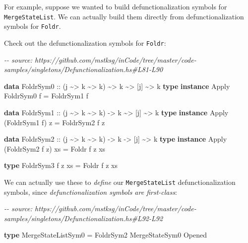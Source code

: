 \documentclass[]{article}
\newenvironment{Shaded}{}{}
\newcommand{\CommentTok}[1]{\textcolor[rgb]{0.38,0.63,0.69}{\textit{#1}}}
\newcommand{\DataTypeTok}[1]{\textcolor[rgb]{0.56,0.13,0.00}{#1}}
\newcommand{\KeywordTok}[1]{\textcolor[rgb]{0.00,0.44,0.13}{\textbf{#1}}}
\newcommand{\NormalTok}[1]{#1}
\newcommand{\OperatorTok}[1]{\textcolor[rgb]{0.40,0.40,0.40}{#1}}
\newcommand{\OtherTok}[1]{\textcolor[rgb]{0.00,0.44,0.13}{#1}}
\begin{document}
For example, suppose we wanted to build defunctionalization symbols for
\texttt{MergeStateList}. We can actually build them directly from
defunctionalization symbols for \texttt{Foldr}.

Check out the defunctionalization symbols for \texttt{Foldr}:

\begin{Shaded}
\begin{Highlighting}[]
\CommentTok{{-}{-} source: https://github.com/mstksg/inCode/tree/master/code{-}samples/singletons/Defunctionalization.hs\#L81{-}L90}

\KeywordTok{data} \DataTypeTok{FoldrSym0}\OtherTok{ ::}\NormalTok{ (j }\OperatorTok{\textasciitilde{}>}\NormalTok{ k }\OperatorTok{\textasciitilde{}>}\NormalTok{ k) }\OperatorTok{\textasciitilde{}>}\NormalTok{ k }\OperatorTok{\textasciitilde{}>}\NormalTok{ [j] }\OperatorTok{\textasciitilde{}>}\NormalTok{ k}
\KeywordTok{type} \KeywordTok{instance} \DataTypeTok{Apply} \DataTypeTok{FoldrSym0}\NormalTok{ f }\OtherTok{=} \DataTypeTok{FoldrSym1}\NormalTok{ f}

\KeywordTok{data} \DataTypeTok{FoldrSym1}\OtherTok{ ::}\NormalTok{ (j }\OperatorTok{\textasciitilde{}>}\NormalTok{ k }\OperatorTok{\textasciitilde{}>}\NormalTok{ k) }\OtherTok{{-}>}\NormalTok{ k }\OperatorTok{\textasciitilde{}>}\NormalTok{ [j] }\OperatorTok{\textasciitilde{}>}\NormalTok{ k}
\KeywordTok{type} \KeywordTok{instance} \DataTypeTok{Apply}\NormalTok{ (}\DataTypeTok{FoldrSym1}\NormalTok{ f) z }\OtherTok{=} \DataTypeTok{FoldrSym2}\NormalTok{ f z}

\KeywordTok{data} \DataTypeTok{FoldrSym2}\OtherTok{ ::}\NormalTok{ (j }\OperatorTok{\textasciitilde{}>}\NormalTok{ k }\OperatorTok{\textasciitilde{}>}\NormalTok{ k) }\OtherTok{{-}>}\NormalTok{ k }\OtherTok{{-}>}\NormalTok{ [j] }\OperatorTok{\textasciitilde{}>}\NormalTok{ k}
\KeywordTok{type} \KeywordTok{instance} \DataTypeTok{Apply}\NormalTok{ (}\DataTypeTok{FoldrSym2}\NormalTok{ f z) xs }\OtherTok{=} \DataTypeTok{Foldr}\NormalTok{ f z xs}

\KeywordTok{type} \DataTypeTok{FoldrSym3}\NormalTok{ f z xs }\OtherTok{=} \DataTypeTok{Foldr}\NormalTok{ f z xs}
\end{Highlighting}
\end{Shaded}

We can actually use these to \emph{define} our \texttt{MergeStateList}
defunctionalization symbols, since \emph{defunctionalization symbols are
first-class}:

\begin{Shaded}
\begin{Highlighting}[]
\CommentTok{{-}{-} source: https://github.com/mstksg/inCode/tree/master/code{-}samples/singletons/Defunctionalization.hs\#L92{-}L92}

\KeywordTok{type} \DataTypeTok{MergeStateListSym0} \OtherTok{=} \DataTypeTok{FoldrSym2} \DataTypeTok{MergeStateSym0} \DataTypeTok{\textquotesingle{}Opened}
\end{Highlighting}
\end{Shaded}
\end{document}
